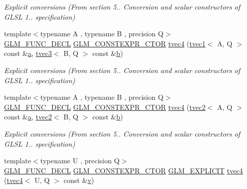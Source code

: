 \begin{DoxyCompactItemize}
\begin{DoxyCompactList}\small\item\em Explicit conversions (From section 5.. Conversion and scalar constructors of G\+L\+SL 1.. specification) \end{DoxyCompactList}\item 
{\footnotesize template$<$typename A , typename B , precision Q$>$ }\\\mbox{\hyperlink{setup_8hpp_ab2d052de21a70539923e9bcbf6e83a51}{G\+L\+M\+\_\+\+F\+U\+N\+C\+\_\+\+D\+E\+CL}} \mbox{\hyperlink{setup_8hpp_ad34178a09666081abdb573c14d1f4a5a}{G\+L\+M\+\_\+\+C\+O\+N\+S\+T\+E\+X\+P\+R\+\_\+\+C\+T\+OR}} \mbox{\hyperlink{structglm_1_1tvec4_a0ac38c053c7884c80e19ad3d96367cc0}{tvec4}} (\mbox{\hyperlink{structglm_1_1tvec1}{tvec1}}$<$ A, Q $>$ const \&\mbox{\hyperlink{glad_8h_ac8729153468b5dcf13f971b21d84d4e5}{a}}, \mbox{\hyperlink{structglm_1_1tvec3}{tvec3}}$<$ B, Q $>$ const \&\mbox{\hyperlink{glad_8h_a6eba317e3cf44d6d26c04a5a8f197dcb}{b}})
\begin{DoxyCompactList}\small\item\em Explicit conversions (From section 5.. Conversion and scalar constructors of G\+L\+SL 1.. specification) \end{DoxyCompactList}\item 
{\footnotesize template$<$typename A , typename B , precision Q$>$ }\\\mbox{\hyperlink{setup_8hpp_ab2d052de21a70539923e9bcbf6e83a51}{G\+L\+M\+\_\+\+F\+U\+N\+C\+\_\+\+D\+E\+CL}} \mbox{\hyperlink{setup_8hpp_ad34178a09666081abdb573c14d1f4a5a}{G\+L\+M\+\_\+\+C\+O\+N\+S\+T\+E\+X\+P\+R\+\_\+\+C\+T\+OR}} \mbox{\hyperlink{structglm_1_1tvec4_ab8d5ba79004e6e4d9ca3ee4f06c3d065}{tvec4}} (\mbox{\hyperlink{structglm_1_1tvec2}{tvec2}}$<$ A, Q $>$ const \&\mbox{\hyperlink{glad_8h_ac8729153468b5dcf13f971b21d84d4e5}{a}}, \mbox{\hyperlink{structglm_1_1tvec2}{tvec2}}$<$ B, Q $>$ const \&\mbox{\hyperlink{glad_8h_a6eba317e3cf44d6d26c04a5a8f197dcb}{b}})
\begin{DoxyCompactList}\small\item\em Explicit conversions (From section 5.. Conversion and scalar constructors of G\+L\+SL 1.. specification) \end{DoxyCompactList}\item 
{\footnotesize template$<$typename U , precision Q$>$ }\\\mbox{\hyperlink{setup_8hpp_ab2d052de21a70539923e9bcbf6e83a51}{G\+L\+M\+\_\+\+F\+U\+N\+C\+\_\+\+D\+E\+CL}} \mbox{\hyperlink{setup_8hpp_ad34178a09666081abdb573c14d1f4a5a}{G\+L\+M\+\_\+\+C\+O\+N\+S\+T\+E\+X\+P\+R\+\_\+\+C\+T\+OR}} \mbox{\hyperlink{setup_8hpp_a6c74f5a5e7b134ab69023ff9a30d4d5d}{G\+L\+M\+\_\+\+E\+X\+P\+L\+I\+C\+IT}} \mbox{\hyperlink{structglm_1_1tvec4_a2330120079eff2ab383c246d178c1682}{tvec4}} (\mbox{\hyperlink{structglm_1_1tvec4}{tvec4}}$<$ U, Q $>$ const \&\mbox{\hyperlink{glad_8h_a14cfbe2fc2234f5504618905b69d1e06}{v}})

\end{DoxyCompactItemize}

